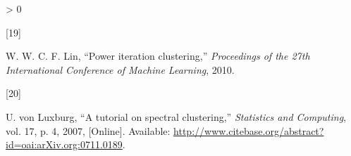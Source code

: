 \documentclass[
]{article}
\newlength{\cslhangindent}
\newlength{\csllabelwidth}
\newenvironment{CSLReferences}[3] %
 {%
  \setlength{\parindent}{0pt}
  \ifodd #1 \everypar{\setlength{\hangindent}{\cslhangindent}}\ignorespaces\fi
  \ifnum #2 > 0
  \setlength{\parskip}{#3\baselineskip}
  \fi
 }%
 {}
\newcommand{\CSLLeftMargin}[1]{\parbox[t]{\maxof{\widthof{#1}}{\csllabelwidth}}{#1}}
\newcommand{\CSLRightInline}[1]{\parbox[t]{\linewidth}{#1}}
\theoremstyle{definition}
\theoremstyle{definition}
\theoremstyle{definition}
\theoremstyle{definition}
\theoremstyle{remark}
\begin{document}
\begin{CSLReferences}{0}{0}
\leavevmode\hypertarget{ref-poweriteration}{}%
\CSLLeftMargin{{[}19{]} }
\CSLRightInline{W. W. C. F. Lin, {``Power iteration clustering,''} \emph{Proceedings of the 27th International Conference of Machine Learning}, 2010.}

\leavevmode\hypertarget{ref-spectraltutorial}{}%
\CSLLeftMargin{{[}20{]} }
\CSLRightInline{U. von Luxburg, {``A tutorial on spectral clustering,''} \emph{Statistics and Computing}, vol. 17, p. 4, 2007, {[}Online{]}. Available: \url{http://www.citebase.org/abstract?id=oai:arXiv.org:0711.0189}.}

\end{CSLReferences}
\end{document}
